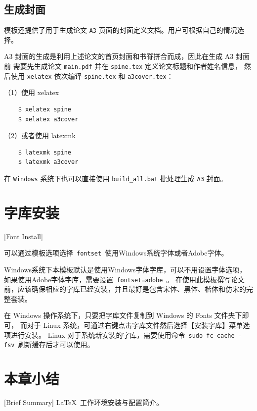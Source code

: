 \subsection{生成封面}

模板还提供了用于生成论文 \texttt{A3} 页面的封面定义文档。用户可根据自己的情况选择。

A3 封面的生成是利用上述论文的首页封面和书脊拼合而成，因此在生成 A3 封面前
需要先生成论文 \texttt{main.pdf} 并在 \texttt{spine.tex} 定义论文标题和作者姓名信息，
然后使用 \texttt{xelatex} 依次编译 \texttt{spine.tex} 和 \texttt{a3cover.tex}：

（1）使用 xelatex

\begin{lstlisting}
    $ xelatex spine
    $ xelatex a3cover
\end{lstlisting}

（2）或者使用 latexmk

\begin{lstlisting}
    $ latexmk spine
    $ latexmk a3cover
\end{lstlisting}

在 \texttt{Windows} 系统下也可以直接使用 \texttt{build\_all.bat} 批处理生成 \texttt{A3} 封面。

\section{字库安装}[Font Install]

可以通过模板选项选择~\texttt{fontset}~使用Windows系统字体或者Adobe字体。

Windows系统下本模板默认是使用Windows字体字库，可以不用设置字体选项，如果使用Adobe字体字库，需要设置~\texttt{fontset=adobe}~。
在使用此模板撰写论文前，应该确保相应的字库已经安装，并且最好是包含宋体、黑体、楷体和仿宋的完整套装。

在 Windows 操作系统下，只要把字库文件复制到 Windows 的 Fonts 文件夹下即可，
而对于 Linux 系统，可通过右键点击字库文件然后选择【安装字库】菜单选项进行安装。
Linux 对于系统新安装的字库，需要使用命令~\texttt{sudo fc-cache -fsv}~刷新缓存后才可以使用。

\section{本章小结}[Brief Summary]
\LaTeX{}~工作环境安装与配置简介。
